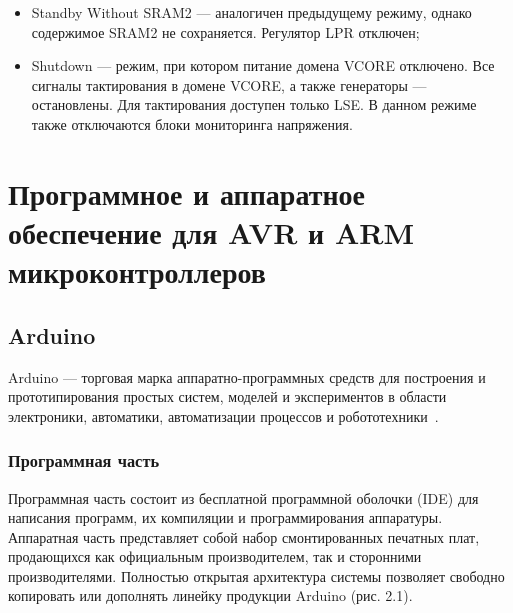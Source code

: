\documentclass[12pt, oneside]{altsu-report}
\begin{document}
\begin{itemize}
    \item Standby Without SRAM2 --- аналогичен предыдущему режиму, однако содержимое SRAM2 не сохраняется. Регулятор LPR отключен;
    
    \item Shutdown --- режим, при котором питание домена VCORE отключено. Все сигналы тактирования в домене VCORE, а также генераторы --- остановлены. Для тактирования доступен только LSE. В данном режиме также отключаются блоки мониторинга напряжения.
\end{itemize}

\chapter{Программное и аппаратное обеспечение для AVR и ARM микроконтроллеров}
\section{Arduino}

Arduino --- торговая марка аппаратно-программных средств для построения и прототипирования простых систем, моделей и экспериментов в области электроники, автоматики, автоматизации процессов и робототехники~\cite{wikiRUArduino}.

\subsection{Программная часть}

Программная часть состоит из бесплатной программной оболочки (IDE) для написания программ, их компиляции и программирования аппаратуры. Аппаратная часть представляет собой набор смонтированных печатных плат, продающихся как официальным производителем, так и сторонними производителями. Полностью открытая архитектура системы позволяет свободно копировать или дополнять линейку продукции Arduino (рис. 2.1).
\end{document}

